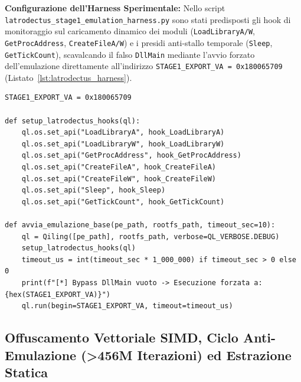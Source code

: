 \documentclass[11pt, a4paper]{article}
\begin{document}
\textbf{Configurazione dell'Harness Sperimentale:} Nello script \texttt{latrodectus\_\allowbreak{}stage1\_\allowbreak{}emulation\_\allowbreak{}harness.\allowbreak{}py} sono stati predisposti gli hook di monitoraggio sul caricamento dinamico dei moduli (\texttt{Load\allowbreak{}LibraryA/\allowbreak{}W}, \texttt{Get\allowbreak{}Proc\allowbreak{}Address}, \texttt{Create\allowbreak{}FileA/\allowbreak{}W}) e i presidi anti-stallo temporale (\texttt{Sleep}, \texttt{GetTickCount}), scavalcando il falso \texttt{DllMain} mediante l'avvio forzato dell'emulazione direttamente all'indirizzo \texttt{STAGE1\_\allowbreak{}EXPORT\_\allowbreak{}VA = 0x180065709} (Listato~\ref{lst:latrodectus_harness}).

\begin{lstlisting}[style=pythoncode, caption={Forzatura dell'esecuzione oltre il falso DllMain verso il vero entry point esportato (0x180065709).}, label={lst:latrodectus_harness}]
STAGE1_EXPORT_VA = 0x180065709

def setup_latrodectus_hooks(ql):
    ql.os.set_api("LoadLibraryA", hook_LoadLibraryA)
    ql.os.set_api("LoadLibraryW", hook_LoadLibraryW)
    ql.os.set_api("GetProcAddress", hook_GetProcAddress)
    ql.os.set_api("CreateFileA", hook_CreateFileA)
    ql.os.set_api("CreateFileW", hook_CreateFileW)
    ql.os.set_api("Sleep", hook_Sleep)
    ql.os.set_api("GetTickCount", hook_GetTickCount)

def avvia_emulazione_base(pe_path, rootfs_path, timeout_sec=10):
    ql = Qiling([pe_path], rootfs_path, verbose=QL_VERBOSE.DEBUG)
    setup_latrodectus_hooks(ql)
    timeout_us = int(timeout_sec * 1_000_000) if timeout_sec > 0 else 0
    print(f"[*] Bypass DllMain vuoto -> Esecuzione forzata a: {hex(STAGE1_EXPORT_VA)}")
    ql.run(begin=STAGE1_EXPORT_VA, timeout=timeout_us)
\end{lstlisting}

\subsection{Offuscamento Vettoriale SIMD, Ciclo Anti-Emulazione (>456M Iterazioni) ed Estrazione Statica}
\end{document}
